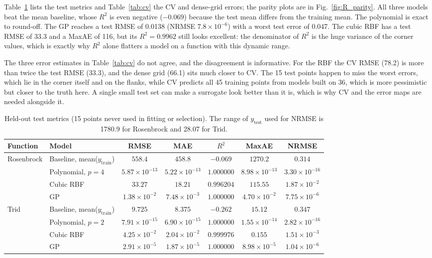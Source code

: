 Table~\ref{tab:test} lists the test metrics and Table~\ref{tab:cv} the CV and dense-grid errors; the parity plots are in Fig.~\ref{fig:R_parity}. All three models beat the mean baseline, whose $R^2$ is even negative ($-0.069$) because the test mean differs from the training mean. The polynomial is exact to round-off. The GP reaches a test RMSE of 0.0138 (NRMSE $7.8\times10^{-6}$) with a worst test error of 0.047. The cubic RBF has a test RMSE of 33.3 and a MaxAE of 116, but its $R^2=0.9962$ still looks excellent: the denominator of $R^2$ is the huge variance of the corner values, which is exactly why $R^2$ alone flatters a model on a function with this dynamic range.

The three error estimates in Table~\ref{tab:cv} do not agree, and the disagreement is informative. For the RBF the CV RMSE (78.2) is more than twice the test RMSE (33.3), and the dense grid (66.1) sits much closer to CV. The 15 test points happen to miss the worst errors, which lie in the corner itself and on the flanks, while CV predicts all 45 training points from models built on 36, which is more pessimistic but closer to the truth here. A single small test set can make a surrogate look better than it is, which is why CV and the error maps are needed alongside it.

\begin{table}[!htbp]
  \centering
  \caption{Held-out test metrics (15 points never used in fitting or selection). The range of $y_{\mathrm{test}}$ used for NRMSE is 1780.9 for Rosenbrock and 28.07 for Trid.}
  \label{tab:test}
  \begin{adjustbox}{max width=\linewidth}
  \begin{tabular}{llccccc}
    \toprule
    Function & Model & RMSE & MAE & $R^2$ & MaxAE & NRMSE \\
    \midrule
    \multirow{4}{*}{Rosenbrock} & Baseline, mean($y_{\mathrm{train}}$) & $558.4$ & $458.8$ & $-0.069$ & $1270.2$ & $0.314$ \\
     & Polynomial, $p=4$ & $5.87\times10^{-13}$ & $5.22\times10^{-13}$ & $1.000000$ & $8.98\times10^{-13}$ & $3.30\times10^{-16}$ \\
     & Cubic RBF & $33.27$ & $18.21$ & $0.996204$ & $115.55$ & $1.87\times10^{-2}$ \\
     & GP & $1.38\times10^{-2}$ & $7.48\times10^{-3}$ & $1.000000$ & $4.70\times10^{-2}$ & $7.75\times10^{-6}$ \\
    \midrule
    \multirow{4}{*}{Trid} & Baseline, mean($y_{\mathrm{train}}$) & $9.725$ & $8.375$ & $-0.262$ & $15.12$ & $0.347$ \\
     & Polynomial, $p=2$ & $7.91\times10^{-15}$ & $6.90\times10^{-15}$ & $1.000000$ & $1.55\times10^{-14}$ & $2.82\times10^{-16}$ \\
     & Cubic RBF & $4.25\times10^{-2}$ & $2.04\times10^{-2}$ & $0.999976$ & $0.155$ & $1.51\times10^{-3}$ \\
     & GP & $2.91\times10^{-5}$ & $1.87\times10^{-5}$ & $1.000000$ & $8.98\times10^{-5}$ & $1.04\times10^{-6}$ \\
    \bottomrule
  \end{tabular}
  \end{adjustbox}
\end{table}

